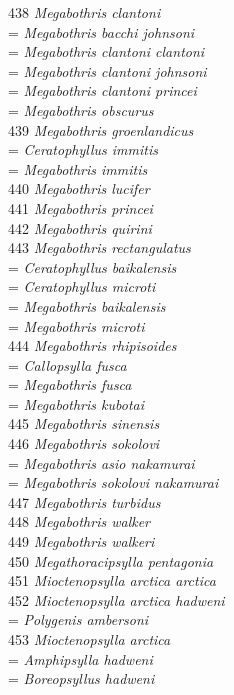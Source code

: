 \documentclass[
]{article}
\begin{document}
438 \emph{Megabothris clantoni}\\
= \emph{Megabothris bacchi johnsoni}\\
= \emph{Megabothris clantoni clantoni}\\
= \emph{Megabothris clantoni johnsoni}\\
= \emph{Megabothris clantoni princei}\\
= \emph{Megabothris obscurus}\\
439 \emph{Megabothris groenlandicus}\\
= \emph{Ceratophyllus immitis}\\
= \emph{Megabothris immitis}\\
440 \emph{Megabothris lucifer}\\
441 \emph{Megabothris princei}\\
442 \emph{Megabothris quirini}\\
443 \emph{Megabothris rectangulatus}\\
= \emph{Ceratophyllus baikalensis}\\
= \emph{Ceratophyllus microti}\\
= \emph{Megabothris baikalensis}\\
= \emph{Megabothris microti}\\
444 \emph{Megabothris rhipisoides}\\
= \emph{Callopsylla fusca}\\
= \emph{Megabothris fusca}\\
= \emph{Megabothris kubotai}\\
445 \emph{Megabothris sinensis}\\
446 \emph{Megabothris sokolovi}\\
= \emph{Megabothris asio nakamurai}\\
= \emph{Megabothris sokolovi nakamurai}\\
447 \emph{Megabothris turbidus}\\
448 \emph{Megabothris walker}\\
449 \emph{Megabothris walkeri}\\
450 \emph{Megathoracipsylla pentagonia}\\
451 \emph{Mioctenopsylla arctica arctica}\\
452 \emph{Mioctenopsylla arctica hadweni}\\
= \emph{Polygenis ambersoni}\\
453 \emph{Mioctenopsylla arctica}\\
= \emph{Amphipsylla hadweni}\\
= \emph{Boreopsyllus hadweni}\\
\end{document}
